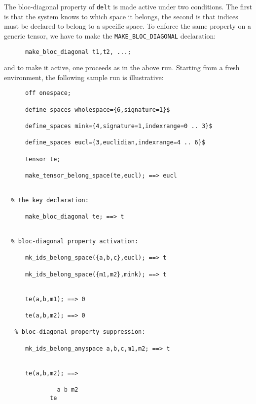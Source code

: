 The bloc-diagonal property of \texttt{delt} is made
active   under two conditions. The first is that the system knows
to which space it belongs, the second is that indices must be
declared to belong to a specific space.
To enforce the same property on a generic tensor, we have to make
the \texttt{MAKE\_BLOC\_DIAGONAL} declaration:
\begin{verbatim}
      make_bloc_diagonal t1,t2, ...;
\end{verbatim}
and to make it active, one proceeds as in the above run.
Starting from a fresh environment, the following sample run
is illustrative:
\begin{verbatim}
      off onespace;

      define_spaces wholespace={6,signature=1}$

      define_spaces mink={4,signature=1,indexrange=0 .. 3}$

      define_spaces eucl={3,euclidian,indexrange=4 .. 6}$

      tensor te;

      make_tensor_belong_space(te,eucl); ==> eucl


  % the key declaration:

      make_bloc_diagonal te; ==> t


  % bloc-diagonal property activation:

      mk_ids_belong_space({a,b,c},eucl); ==> t

      mk_ids_belong_space({m1,m2},mink); ==> t


      te(a,b,m1); ==> 0

      te(a,b,m2); ==> 0

   % bloc-diagonal property suppression:

      mk_ids_belong_anyspace a,b,c,m1,m2; ==> t


      te(a,b,m2); ==>

               a b m2
             te
\end{verbatim}

